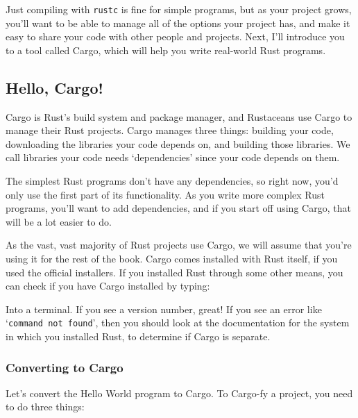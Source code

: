 \documentclass[a4paper,]{book}
\renewcommand*{\hypertarget}[3][\ar]{%
  \def\ar{#2}%
  \label{#1}%
  #3}
\newenvironment{Shaded}{\begin{snugshade}}{\end{snugshade}}
\newcommand{\KeywordTok}[1]{\textcolor[rgb]{0.13,0.29,0.53}{\textbf{{#1}}}}
\newcommand{\NormalTok}[1]{{#1}}
\begin{document}
Just compiling with \texttt{rustc} is fine for simple programs, but as
your project grows, you'll want to be able to manage all of the options
your project has, and make it easy to share your code with other people
and projects. Next, I'll introduce you to a tool called Cargo, which
will help you write real-world Rust programs.

\hypertarget{hello-cargo}{\subsection{Hello, Cargo!}\label{hello-cargo}}

Cargo is Rust's build system and package manager, and Rustaceans use
Cargo to manage their Rust projects. Cargo manages three things:
building your code, downloading the libraries your code depends on, and
building those libraries. We call libraries your code needs
`dependencies' since your code depends on them.

The simplest Rust programs don't have any dependencies, so right now,
you'd only use the first part of its functionality. As you write more
complex Rust programs, you'll want to add dependencies, and if you start
off using Cargo, that will be a lot easier to do.

As the vast, vast majority of Rust projects use Cargo, we will assume
that you're using it for the rest of the book. Cargo comes installed
with Rust itself, if you used the official installers. If you installed
Rust through some other means, you can check if you have Cargo installed
by typing:

\begin{Shaded}
\end{Shaded}

Into a terminal. If you see a version number, great! If you see an error
like `\texttt{command\ not\ found}', then you should look at the
documentation for the system in which you installed Rust, to determine
if Cargo is separate.

\subsubsection{Converting to Cargo}\label{converting-to-cargo}

Let's convert the Hello World program to Cargo. To Cargo-fy a project,
you need to do three things:
\end{document}
